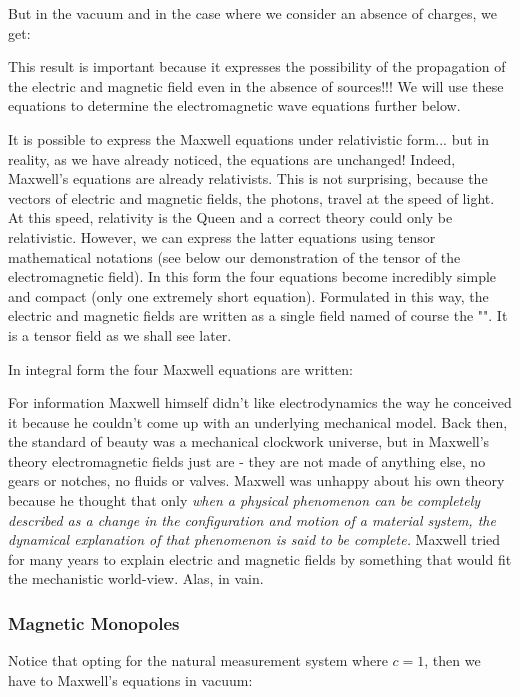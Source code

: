 	But in the vacuum and in the case where we consider an absence of charges, we get:
	
	This result is important because it expresses the possibility of the propagation of the electric and magnetic field even in the absence of sources!!! We will use these equations to determine the electromagnetic wave equations further below.
	\begin{tcolorbox}[title=Remark,colframe=black,arc=10pt]
	It is possible to express the Maxwell equations under relativistic form... but in reality, as we have already noticed, the equations are unchanged! Indeed, Maxwell's equations are already relativists. This is not surprising, because the vectors of electric and magnetic fields, the photons, travel at the speed of light. At this speed, relativity is the Queen and a correct theory could only be relativistic. However, we can express the latter equations using tensor mathematical notations (see below our demonstration of the tensor of the electromagnetic field). In this form the four equations become incredibly simple and compact (only one extremely short equation). Formulated in this way, the electric and magnetic fields are written as a single field named of course the "". It is a tensor field as we shall see later.
	\end{tcolorbox}
	In integral form the four Maxwell equations are written:
	
	For information Maxwell himself didn't like electrodynamics the way he conceived it because he couldn't come up with an underlying mechanical model. Back then, the standard of beauty was a mechanical clockwork universe, but in Maxwell's theory electromagnetic fields just are - they are not made of anything else, no gears or notches, no fluids or valves. Maxwell was unhappy about his own theory because he thought that only \og \textit{when a physical phenomenon can be completely described as a change in the configuration and motion of a material system, the dynamical explanation of that phenomenon is said to be complete.} \fg{} Maxwell tried for many years to explain electric and magnetic fields by something that would fit the mechanistic world-view. Alas, in vain.

	\subsubsection{Magnetic Monopoles}
	Notice that opting for the natural measurement system where $c=1$, then we have to Maxwell's equations in vacuum:
	
